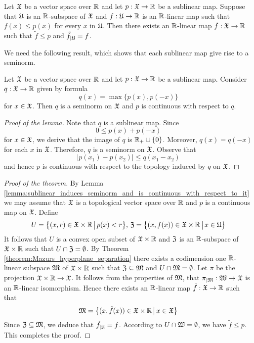 \begin{theorem}\label{theorem:Hahn_Banach_real_case}
Let ${\mathfrak X}$ be a vector space over ${\mathbb R}$ and let $p:{\mathfrak X}\rightarrow {\mathbb R}$ be a sublinear map. Suppose that ${\mathfrak U}$ is an ${\mathbb R}$-subspace of ${\mathfrak X}$ and $f:{\mathfrak U}\rightarrow {\mathbb R}$ is an ${\mathbb R}$-linear map such that $f(x) \leq p(x)$ for every $x$ in ${\mathfrak U}$. Then there exists an ${\mathbb R}$-linear map $\tilde{f}:{\mathfrak X} \rightarrow {\mathbb R}$ such that $\tilde{f} \leq p$ and $\tilde{f}_{\mid {\mathfrak U}} = f$. 
\end{theorem}
\noindent
We need the following result, which shows that each sublinear map give rise to a seminorm.

\begin{lemma}\label{lemma:sublinear_induces_seminorm_and_is_continuous_with_respect_to_it}
Let ${\mathfrak X}$ be a vector space over ${\mathbb R}$ and let $p:{\mathfrak X} \rightarrow {\mathbb R}$ be a sublinear map. Consider $q:{\mathfrak X} \rightarrow {\mathbb R}$ given by formula
$$q(x) = \max\{p(x),p(-x)\}$$
for $x \in {\mathfrak X}$. Then $q$ is a seminorm on ${\mathfrak X}$ and $p$ is continuous with respect to $q$. 
\end{lemma}
\begin{proof}[Proof of the lemma]
Note that $q$ is a sublinear map. Since 
$$0\leq p(x) + p(-x)$$
for $x \in {\mathfrak X}$, we derive that the image of $q$ is ${\mathbb R}_+\cup \{0\}$. Moreover, $q(x) = q(-x)$ for each $x$ in ${\mathfrak X}$. Therefore, $q$ is a seminorm on ${\mathfrak X}$. Observe that
$$|p(x_1) - p(x_2)|\leq q(x_1 - x_2)$$
and hence $p$ is continuous with respect to the topology induced by $q$ on ${\mathfrak X}$.
\end{proof}

\begin{proof}[Proof of the theorem]
By Lemma \ref{lemma:sublinear_induces_seminorm_and_is_continuous_with_respect_to_it} we may assume that ${\mathfrak X}$ is a topological vector space over ${\mathbb R}$ and $p$ is a continuous map on ${\mathfrak X}$. Define
$$U = \big\{(x,r)\in {\mathfrak X}\times {\mathbb R}\,\big|\,p(x) < r\big\},\,{\mathfrak Z} = \big\{(x,f(x))\in {\mathfrak X}\times {\mathbb R}\,\big|\,x\in {\mathfrak U}\big\}$$ 
It follows that $U$ is a convex open subset of ${\mathfrak X}\times {\mathbb R}$ and ${\mathfrak Z}$ is an ${\mathbb R}$-subspace of ${\mathfrak X}\times {\mathbb R}$ such that $U \cap {\mathfrak Z} = \emptyset$. By Theorem \ref{theorem:Mazurs_hyperplane_separation} there exists a codimension one ${\mathbb R}$-linear subspace ${\mathfrak M}$ of ${\mathfrak X}\times {\mathbb R}$ such that ${\mathfrak Z} \subseteq {\mathfrak M}$ and $U\cap {\mathfrak M} = \emptyset$. Let $\pi$ be the projection ${\mathfrak X}\times {\mathbb R}\rightarrow {\mathfrak X}$. It follows from the properties of ${\mathfrak M}$, that $\pi_{\mid {\mathfrak M}}:{\mathfrak W}\rightarrow {\mathfrak X}$ is an ${\mathbb R}$-linear isomorphism. Hence there exists an ${\mathbb R}$-linear map $\tilde{f}:{\mathfrak X} \rightarrow {\mathbb R}$ such that 
$${\mathfrak M} = \big\{(x,\tilde{f}(x))\in {\mathfrak X}\times {\mathbb R}\,\big|\,x \in {\mathfrak X}\big\}$$
Since ${\mathfrak Z} \subseteq {\mathfrak M}$, we deduce that $\tilde{f}_{\mid {\mathfrak U}} = f$. According to $U\cap {\mathfrak W} = \emptyset$, we have $\tilde{f} \leq p$. This completes the proof.
\end{proof}


